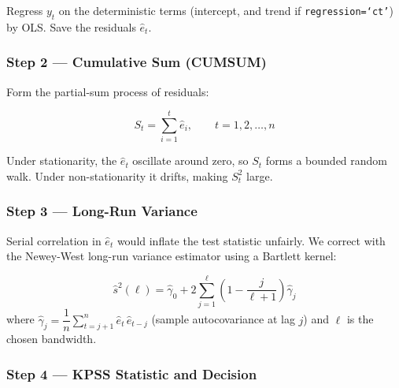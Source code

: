 \documentclass[10pt,a4paper,twocolumn]{article}
\begin{document}
Regress $y_t$ on the deterministic terms (intercept, and trend if
\texttt{regression=`ct'}) by OLS.  Save the residuals $\hat{e}_t$.

\subsubsection{Step 2 --- Cumulative Sum (CUMSUM)}

Form the partial-sum process of residuals:

\begin{tcolorbox}[mathbox={KPSS Formula 1 --- CUMSUM}]
\vspace{-4pt}
\begin{equation}
  S_t = \sum_{i=1}^{t} \hat{e}_i, \qquad t = 1, 2, \ldots, n
\end{equation}
\vspace{-4pt}
\end{tcolorbox}

Under stationarity, the $\hat{e}_t$ oscillate around zero, so $S_t$
forms a bounded random walk.  Under non-stationarity it drifts,
making $S_t^2$ large.

\subsubsection{Step 3 --- Long-Run Variance}

Serial correlation in $\hat{e}_t$ would inflate the test statistic
unfairly.  We correct with the Newey-West long-run variance
estimator using a Bartlett kernel:

\begin{tcolorbox}[mathbox={KPSS Formula 2 --- Long-Run Variance}]
\vspace{-4pt}
\begin{equation}
  \hat{s}^2(\ell) = \hat\gamma_0 +
    2\sum_{j=1}^{\ell}\!\left(1-\frac{j}{\ell+1}\right)\hat\gamma_j
\end{equation}
\vspace{-2pt}
where $\hat\gamma_j = \dfrac{1}{n}\displaystyle\sum_{t=j+1}^{n}
\hat{e}_t\,\hat{e}_{t-j}$ (sample autocovariance at lag $j$)
and $\ell$ is the chosen bandwidth.
\vspace{-2pt}
\end{tcolorbox}

\subsubsection{Step 4 --- KPSS Statistic and Decision}
\end{document}
